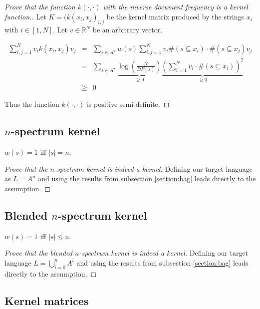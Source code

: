 \documentclass[a4paper, 12pt, titlepage]{article}
\begin{document}
\begin{proof}[Prove that the function $k(\cdot,\cdot)$ with the inverse document frequency is a kernel function.]


Let $K=(k(x_i,x_j)_{i,j}$ be the kernel matrix produced by the strings $x_i$ with $i\in [1,N]$.
Let $v \in \mathbb{R}^{N}$ be an arbitrary vector.

\begin{eqnarray*}
	\sum_{i,j=1}^{N} v_i k(x_i,x_j) v_j &=& \sum_{s\in\mathcal{A}^\star} w(s) \sum_{i,j=1}^N v_i \#(s\subseteq x_i)\cdot \#(s\subseteq x_j) v_j \\
	&=& \sum_{s\in\mathcal{A}^\star} \underbrace{\log \left( \frac{N}{DF(s)} \right)}_{\ge 0} \underbrace{\left( \sum_{i=1}^N v_i \cdot \#(s\subseteq x_i) \right)^2}_{\ge 0} \\
	&\ge& 0
\end{eqnarray*}

Thus the function $k(\cdot,\cdot)$ is positive semi-definite.

\end{proof}

\subsection{$n$-spectrum kernel}

$w(s)=1$ iff $|s|=n$.
\begin{proof}[Prove that the $n$-spectrum kernel is indeed a kernel]

Defining our target language as $L=A^n$ and using the results from subsection \ref{section:bag} leads directly to the assumption.

\end{proof}

\subsection{Blended $n$-spectrum kernel}

$w(s)=1$ iff $|s| \le n$.

\begin{proof}[Prove that the blended $n$-spectrum kernel is indeed a kernel]

Defining our target language $L=\bigcup_{i=0}^n A^i$ and using the results from subsection \ref{section:bag} leads directly to the assumption.

\end{proof}

\subsection{Kernel matrices}
\end{document}
